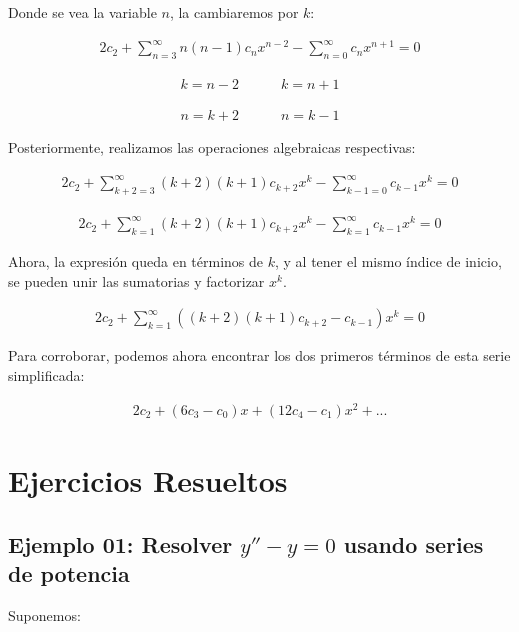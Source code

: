 Donde se vea la variable \( n \), la cambiaremos por \( k \):

\begin{gather*}
2c_{2} +\sum _{n=3}^{\infty } n( n-1) c_{n} x^{n-2} -\sum _{n=0}^{\infty } c_{n} x^{n+1} = 0
\end{gather*}

\begin{gather*}
k = n-2 \quad \quad \quad k = n+1
\end{gather*}

\begin{gather*}
n = k+2 \quad \quad \quad n = k-1
\end{gather*}

Posteriormente, realizamos las operaciones algebraicas respectivas:

\begin{gather*}
2c_{2} +\sum _{k+2=3}^{\infty }( k+2)( k+1) c_{k+2} x^{k} -\sum _{k-1=0}^{\infty } c_{k-1} x^{k} = 0
\end{gather*}

\begin{gather*}
2c_{2} +\sum _{k=1}^{\infty }( k+2)( k+1) c_{k+2} x^{k} -\sum _{k=1}^{\infty } c_{k-1} x^{k} = 0
\end{gather*}

Ahora, la expresión queda en términos de \( k \), y al tener el mismo índice de inicio,  
se pueden unir las sumatorias y factorizar \( x^{k} \).

\begin{gather*}
2c_{2} +\sum _{k=1}^{\infty }(( k+2)( k+1) c_{k+2} - c_{k-1}) x^{k} = 0
\end{gather*}

Para corroborar, podemos ahora encontrar los dos primeros términos de esta serie simplificada:

\begin{gather*}
2c_{2} +( 6c_{3} -c_{0}) x + ( 12c_{4} -c_{1}) x^{2} +...
\end{gather*}

\section{Ejercicios Resueltos}

\subsection*{Ejemplo 01: Resolver \( y'' - y = 0 \) usando series de potencia}
Suponemos:

